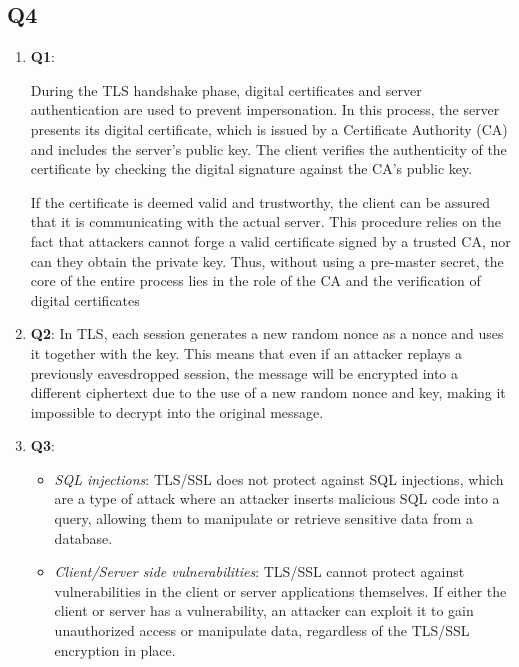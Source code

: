 \documentclass{article}
\begin{document}
\subsection{Q4}

	\begin{enumerate}
		\item \textbf{Q1}: 

		During the TLS handshake phase, digital certificates and server authentication are used to prevent impersonation. In this process, the server presents its digital certificate, which is issued by a Certificate Authority (CA) and includes the server's public key. The client verifies the authenticity of the certificate by checking the digital signature against the CA's public key.

		If the certificate is deemed valid and trustworthy, the client can be assured that it is communicating with the actual server. This procedure relies on the fact that attackers cannot forge a valid certificate signed by a trusted CA, nor can they obtain the private key. Thus, without using a pre-master secret, the core of the entire process lies in the role of the CA and the verification of digital certificates

		\item \textbf{Q2}:
		In TLS, each session generates a new random nonce as a nonce and uses it together with the key\cite{5-2.security-protocol}. This means that even if an attacker replays a previously eavesdropped session, the message will be encrypted into a different ciphertext due to the use of a new random nonce and key, making it impossible to decrypt into the original message. 

		\item \textbf{Q3}:
			\begin{itemize}
				\item \textit{SQL injections}: TLS/SSL does not protect against SQL injections, which are a type of attack where an attacker inserts malicious SQL code into a query, allowing them to manipulate or retrieve sensitive data from a database\cite{5-2.security-protocol}.

				\item \textit{Client/Server side vulnerabilities}: TLS/SSL cannot protect against vulnerabilities in the client or server applications themselves\cite{5-2.security-protocol}. If either the client or server has a vulnerability, an attacker can exploit it to gain unauthorized access or manipulate data, regardless of the TLS/SSL encryption in place.
			\end{itemize}

	\end{enumerate}


 
\end{document}
